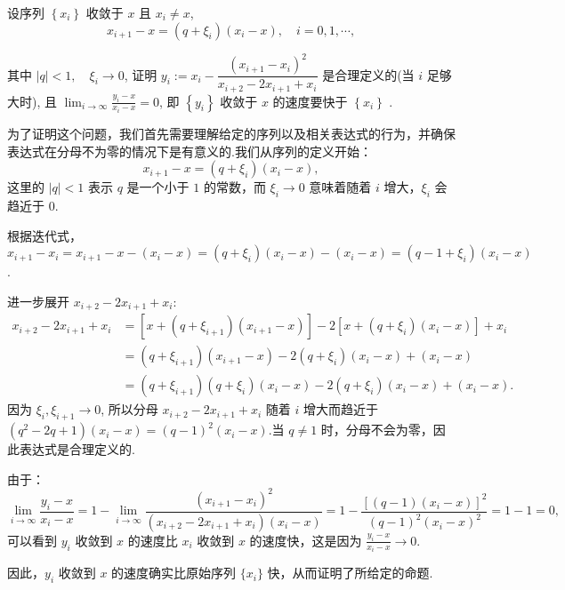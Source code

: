 \begin{tcolorbox}[enhanced,colback=10,colframe=9,breakable,coltitle=green!25!black,title=2024]
  
设序列 $ \left\{x_{i}\right\} $ 收敛于 $ x $ 且 $ x_{i} \neq x $,
$$
x_{i+1}-x=\left(q+\xi_{i}\right)\left(x_{i}-x\right), \quad i=0,1, \cdots,
$$

其中 $ |q|<1, \quad \xi_{i} \rightarrow 0 $, 证明
$ y_{i}:=x_{i}-\dfrac{\left(x_{i+1}-x_{i}\right)^{2}}{x_{i+2}-2 x_{i+1}+x_{i}} $ 是合理定义的(当 $ i $ 足够大时), 且 $\displaystyle \lim _{i \rightarrow \infty} \frac{y_{i}-x}{x_{i}-x}=0 $, 即 $ \left\{y_{i}\right\} $ 收敛于 $ x $ 的速度要快于 $ \left\{x_{i}\right\} $ .

\tcblower

为了证明这个问题，我们首先需要理解给定的序列以及相关表达式的行为，并确保表达式在分母不为零的情况下是有意义的.我们从序列的定义开始：
$$
x_{i+1}-x=\left(q+\xi_{i}\right)\left(x_{i}-x\right),
$$
这里的 $|q|<1$ 表示 $q$ 是一个小于 $1$ 的常数，而 $\xi_i \rightarrow 0$ 意味着随着 $i$ 增大，$\xi_i$ 会趋近于 $0$.

 根据迭代式，$x_{i+1}-x_{i} = x_{i+1} - x - (x_{i} - x) = (q + \xi_i)(x_i - x) - (x_i - x) = (q - 1 + \xi_i)(x_i - x)$.

 进一步展开 $x_{i+2} - 2x_{i+1} + x_i$:
$$
\begin{aligned}
   x_{i+2} - 2x_{i+1} + x_i &= [x + (q + \xi_{i+1})(x_{i+1} - x)] - 2[x + (q + \xi_i)(x_i - x)] + x_i \\
   &= (q + \xi_{i+1})(x_{i+1} - x) - 2(q + \xi_i)(x_i - x) + (x_i - x) \\
   &= (q + \xi_{i+1})(q + \xi_i)(x_i - x) - 2(q + \xi_i)(x_i - x) + (x_i - x).
\end{aligned}
$$
因为 $\xi_i, \xi_{i+1} \rightarrow 0$, 所以分母 $x_{i+2} - 2x_{i+1} + x_i$ 随着 $i$ 增大而趋近于 $(q^2 - 2q + 1)(x_i - x) = (q-1)^2(x_i - x)$.当 $q \neq 1$ 时，分母不会为零，因此表达式是合理定义的.

由于：
$$
\lim_{i\to \infty}\frac{y_i - x}{x_i - x} = 1 - \lim_{i\to \infty}\frac{(x_{i+1} - x_i)^2}{(x_{i+2} - 2x_{i+1} + x_i)(x_i - x)}= 1 - \frac{[(q-1)(x_i - x)]^2}{(q-1)^2(x_i - x)^2} = 1 - 1 = 0,
$$
可以看到 $y_i$ 收敛到 $x$ 的速度比 $x_i$ 收敛到 $x$ 的速度快，这是因为 $\frac{y_i - x}{x_i - x} \to 0$.

因此，$y_i$ 收敛到 $x$ 的速度确实比原始序列 $\{x_i\}$ 快，从而证明了所给定的命题.
\end{tcolorbox}


